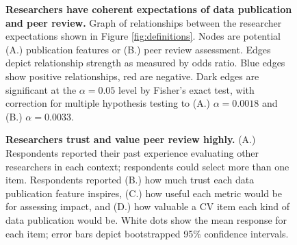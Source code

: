 \documentclass[10pt]{article}
\begin{document}
\begin{figure}[!ht]
\begin{center}
\end{center}
\caption{
{\bf Researchers have coherent expectations of data publication and peer review.}
Graph of relationships between the researcher expectations shown in Figure \ref{fig:definitions}. 
Nodes are potential (A.) publication features or (B.) peer review assessment.
Edges depict relationship strength as measured by odds ratio.  
Blue edges show positive relationships, red are negative. 
Dark edges are significant at the $\alpha=0.05$ level by Fisher's exact test, with correction for multiple hypothesis testing to (A.) $\alpha=0.0018$ and (B.) $\alpha=0.0033$.
}
\label{fig:definition_web}
\end{figure}


\begin{figure}[!ht]
\begin{center}
\end{center}
\caption{
{\bf Researchers trust and value peer review highly.}
(A.) Respondents reported their past experience evaluating other researchers in each context; respondents could select more than one item.
Respondents reported (B.) how much trust each data publication feature inspires, (C.) how useful each metric would be for assessing impact, and (D.) how valuable a CV item each kind of data publication would be.
White dots show the mean response for each item; error bars depict bootstrapped 95\% confidence intervals.
}

\label{fig:values}
\end{figure}
\end{document}
